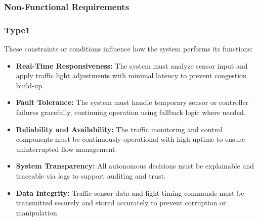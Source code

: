 \documentclass[a4paper,12pt]{article}
\begin{document}
\subsubsection{Non-Functional Requirements}

\subsubsection*{Type1}
These constraints or conditions influence how the system performs its functions:
\begin{itemize}
    \item \textbf{Real-Time Responsiveness:}  
    The system must analyze sensor input and apply traffic light adjustments with minimal latency to prevent congestion build-up.

    \item \textbf{Fault Tolerance:}  
    The system must handle temporary sensor or controller failures gracefully, continuing operation using fallback logic where needed.

    \item \textbf{Reliability and Availability:}  
    The traffic monitoring and control components must be continuously operational with high uptime to ensure uninterrupted flow management.

    \item \textbf{System Transparency:}  
    All autonomous decisions must be explainable and traceable via logs to support auditing and trust.

    \item \textbf{Data Integrity:}  
    Traffic sensor data and light timing commands must be transmitted securely and stored accurately to prevent corruption or manipulation.
\end{itemize}
\end{document}
